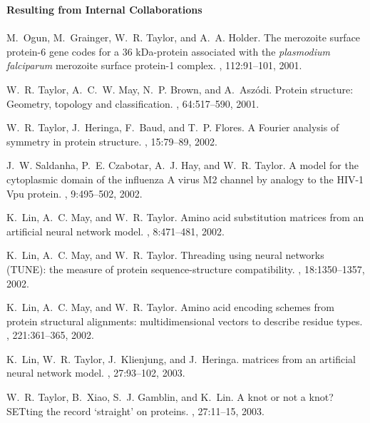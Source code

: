 \begin{thebibliography}{100}

{\bf Resulting from Internal Collaborations}\\ \\

M.~Ogun, M.~Grainger, W.~R. Taylor, and A.~A. Holder.
\newblock The merozoite surface protein-6 gene codes for a 36 {kDa}-protein
  associated with the {\em plasmodium falciparum} merozoite surface protein-1
  complex.
, 112:91--101, 2001.

W.~R. Taylor, A.~C.~W. May, N.~P. Brown, and A.~Asz\'odi.
\newblock Protein structure: Geometry, topology and classification.
, 64:517--590, 2001.

W.~R. Taylor, J.~Heringa, F.~Baud, and T.~P. Flores.
\newblock A {Fourier} analysis of symmetry in protein structure.
, 15:79--89, 2002.

J.~W. Saldanha, P.~E. Czabotar, A.~J. Hay, and W.~R. Taylor.
\newblock A model for the cytoplasmic domain of the influenza {A} virus {M2}
  channel by analogy to the {HIV-1 Vpu} protein.
, 9:495--502, 2002.

K.~Lin, A.~C. May, and W.~R. Taylor.
\newblock Amino acid substitution matrices from an artificial neural network
  model.
, 8:471--481, 2002.

K.~Lin, A.~C. May, and W.~R. Taylor.
\newblock Threading using neural networks ({TUNE}): the measure of protein
  sequence-structure compatibility.
, 18:1350--1357, 2002.

K.~Lin, A.~C. May, and W.~R. Taylor.
\newblock Amino acid encoding schemes from protein structural alignments:
  multidimensional vectors to describe residue types.
, 221:361--365, 2002.

K.~Lin, W.~R. Taylor, J.~Klienjung, and J.~Heringa.
 matrices from an artificial neural network model.
, 27:93--102, 2003.

W.~R. Taylor, B.~Xiao, S.~J. Gamblin, and K.~Lin.
\newblock A knot or not a knot? {SET}ting the record `straight' on proteins.
, 27:11--15, 2003.


\end{thebibliography}

